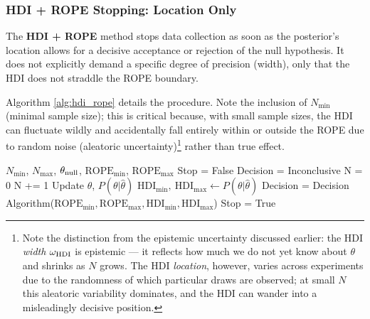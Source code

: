 \subsubsection{HDI + ROPE Stopping: Location Only}\label{sec:hdi_rope_stopping}

The \textbf{HDI + ROPE} method stops data collection as soon as the posterior's location allows for a decisive acceptance or rejection of the null hypothesis. It does not explicitly demand a specific degree of precision (width), only that the HDI does not straddle the ROPE boundary.

Algorithm \ref{alg:hdi_rope} details the procedure. Note the inclusion of $N_\mathrm{min}$
(minimal sample size); this is critical because, with small sample sizes, the HDI can
fluctuate wildly and accidentally fall entirely within or outside the ROPE due to random noise
(aleatoric uncertainty)\footnote{Note the distinction from the epistemic uncertainty discussed
earlier: the HDI \textit{width} $\omega_{\rm HDI}$ is epistemic --- it reflects how much we do not yet know about
$\theta$ and shrinks as $N$ grows. The HDI \textit{location}, however, varies across experiments
due to the randomness of which particular draws are observed; at small $N$ this aleatoric
variability dominates, and the HDI can wander into a misleadingly decisive position.} rather
than true effect.

\begin{algorithm}
    \caption{HDI + ROPE}\label{alg:hdi_rope}
    \begin{algorithmic}
    \Require $N_\mathrm{min}$, $N_\mathrm{max}$, $\theta_{\rm null}$, $\mathrm{ROPE}_\mathrm{min}$, $\mathrm{ROPE}_\mathrm{max}$
    \State Stop = False
    \State Decision = Inconclusive
    \State N = 0
    \State N += 1 
    \State Update $\hat\theta$, $P(\theta|\hat\theta)$ 
    \State $\mathrm{HDI}_\mathrm{min}, \ \mathrm{HDI}_\mathrm{max}  \gets P(\theta|\hat\theta)$
        \State Decision = Decision Algorithm($\mathrm{ROPE}_\mathrm{min}, \mathrm{ROPE}_\mathrm{max}, \mathrm{HDI}_\mathrm{min}, \mathrm{HDI}_\mathrm{max}$)
            \State \HiLi Stop = True 
        \EndIf
    \EndIf
    \EndWhile
    \end{algorithmic}
\end{algorithm}

